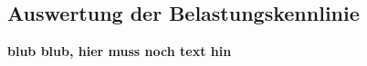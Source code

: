 \documentclass[
a4paper,     %
 headsepline, %
11pt         %
]{scrartcl}  %
\begin{document}
\subsection{Auswertung der Belastungskennlinie}

\textbf{blub blub, hier muss noch text hin}



% 

% 
\end{document}
